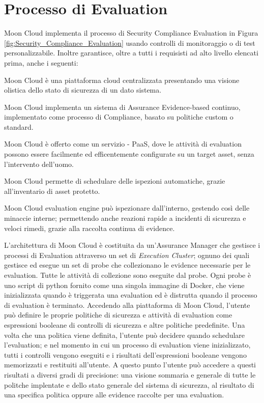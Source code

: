 \section{Processo di Evaluation}
Moon Cloud implementa il processo di Security Compliance Evaluation in Figura \ref{fig:Security_Compliance_Evaluation} usando controlli 
di monitoraggio o di test personalizzabile. Inoltre garantisce, oltre a tutti i requisisti ad alto livello elencati prima, 
anche i seguenti:
\begin{description}
	\item Moon Cloud è una piattaforma cloud centralizzata presentando una visione olistica dello stato di sicurezza di un dato sistema.
	\item Moon Cloud implementa un sistema di Assurance Evidence-based continuo, implementato come processo di Compliance,
	basato su politiche custom o standard.
	\item Moon Cloud è offerto come un servizio - PaaS, dove le attività di evaluation possono essere facilmente ed efficentemente 
	configurate su un target asset, senza l'intervento dell'uomo.
	\item Moon Cloud permette di schedulare delle ispezioni automatiche, grazie all'inventario di asset protetto.
	\item Moon Cloud evaluation engine può ispezionare dall'interno, gestendo così delle minaccie interne; permettendo anche reazioni 
	rapide a incidenti di sicurezza e veloci rimedi, grazie alla raccolta continua di evidence. 
\end{description}


L'architettura di Moon Cloud è costituita da un'Assurance Manager che gestisce i processi di Evaluation attraverso un set di 
\textit{Execution Cluster}; ognuno dei quali gestisce ed esegue un set di probe che collezionano le evidence necessarie per le evaluation.
Tutte le attività di collezione sono eseguite dal probe. Ogni probe è uno script di python fornito come una singola immagine di Docker, 
che viene inizializzata quando è triggerata una evaluation ed è distrutta quando il processo di evaluation è terminato.
\newline
Accedendo alla piattaforma di Moon Cloud, l'utente può definire le proprie politiche di sicurezza e attività di evaluation come 
espressioni booleane di controlli di sicurezza e altre politiche predefinite. Una volta che una politica viene definita, l'utente può 
decidere quando schedulare l'evaluation; e nel momento in cui un processo di evaluation viene inizializzato, tutti i controlli vengono 
eseguiti e i risultati dell'espressioni booleane vengono memorizzati e restituiti all'utente. A questo punto l'utente può accedere a 
questi risultati a diversi gradi di precisione: una visione sommaria e generale di tutte le politche implentate e dello stato generale 
del sistema di sicurezza, al risultato di una specifica politica oppure alle evidence raccolte per una evaluation.


